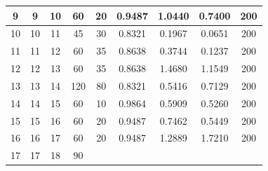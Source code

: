 \documentclass[12pt]{article}
\begin{document}
\begin{table}[htbp]
{\begin{tabular}{|ccccccccc|}
				\multicolumn{1}{|c|}{9} &
				\multicolumn{1}{c|}{9} &
				\multicolumn{1}{c|}{10} &
				\multicolumn{1}{c|}{60} &
				\multicolumn{1}{c|}{20} &
				\multicolumn{1}{c|}{0.9487} &
				\multicolumn{1}{c|}{1.0440} &
				\multicolumn{1}{c|}{0.7400} &
				200 \\ \hline
				\multicolumn{1}{|c|}{10} &
				\multicolumn{1}{c|}{10} &
				\multicolumn{1}{c|}{11} &
				\multicolumn{1}{c|}{45} &
				\multicolumn{1}{c|}{30} &
				\multicolumn{1}{c|}{0.8321} &
				\multicolumn{1}{c|}{0.1967} &
				\multicolumn{1}{c|}{0.0651} &
				200 \\ \hline
				\multicolumn{1}{|c|}{11} &
				\multicolumn{1}{c|}{11} &
				\multicolumn{1}{c|}{12} &
				\multicolumn{1}{c|}{60} &
				\multicolumn{1}{c|}{35} &
				\multicolumn{1}{c|}{0.8638} &
				\multicolumn{1}{c|}{0.3744} &
				\multicolumn{1}{c|}{0.1237} &
				200 \\ \hline
				\multicolumn{1}{|c|}{12} &
				\multicolumn{1}{c|}{12} &
				\multicolumn{1}{c|}{13} &
				\multicolumn{1}{c|}{60} &
				\multicolumn{1}{c|}{35} &
				\multicolumn{1}{c|}{0.8638} &
				\multicolumn{1}{c|}{1.4680} &
				\multicolumn{1}{c|}{1.1549} &
				200 \\ \hline
				\multicolumn{1}{|c|}{13} &
				\multicolumn{1}{c|}{13} &
				\multicolumn{1}{c|}{14} &
				\multicolumn{1}{c|}{120} &
				\multicolumn{1}{c|}{80} &
				\multicolumn{1}{c|}{0.8321} &
				\multicolumn{1}{c|}{0.5416} &
				\multicolumn{1}{c|}{0.7129} &
				200 \\ \hline
				\multicolumn{1}{|c|}{14} &
				\multicolumn{1}{c|}{14} &
				\multicolumn{1}{c|}{15} &
				\multicolumn{1}{c|}{60} &
				\multicolumn{1}{c|}{10} &
				\multicolumn{1}{c|}{0.9864} &
				\multicolumn{1}{c|}{0.5909} &
				\multicolumn{1}{c|}{0.5260} &
				200 \\ \hline
				\multicolumn{1}{|c|}{15} &
				\multicolumn{1}{c|}{15} &
				\multicolumn{1}{c|}{16} &
				\multicolumn{1}{c|}{60} &
				\multicolumn{1}{c|}{20} &
				\multicolumn{1}{c|}{0.9487} &
				\multicolumn{1}{c|}{0.7462} &
				\multicolumn{1}{c|}{0.5449} &
				200 \\ \hline
				\multicolumn{1}{|c|}{16} &
				\multicolumn{1}{c|}{16} &
				\multicolumn{1}{c|}{17} &
				\multicolumn{1}{c|}{60} &
				\multicolumn{1}{c|}{20} &
				\multicolumn{1}{c|}{0.9487} &
				\multicolumn{1}{c|}{1.2889} &
				\multicolumn{1}{c|}{1.7210} &
				200 \\ \hline
				\multicolumn{1}{|c|}{17} &
				\multicolumn{1}{c|}{17} &
				\multicolumn{1}{c|}{18} &
				\multicolumn{1}{c|}{90} &

\end{tabular}}
\end{table}
\end{document}
